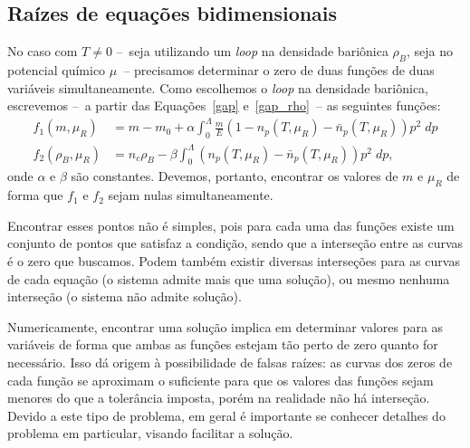 \subsection{Raízes de equações bidimensionais}

No caso com $T \neq 0$ --~seja utilizando um \emph{loop} na densidade bariônica $\rho_B$, seja no potencial químico $\mu$~-- precisamos determinar o zero de duas funções de duas variáveis simultaneamente. Como escolhemos o \emph{loop} na densidade bariônica, escrevemos --~a partir das Equações~\eqref{gap} e~\eqref{gap_rho}~-- as seguintes funções:
\begin{align}
	f_1(m, \mu_R) &= m - m_0 + \alpha\int_0^\Lambda \frac{m}{E} (1 - n_p(T, \mu_R) - \bar{n}_p(T, \mu_R)) p^2\;dp \\
	f_2(\rho_B, \mu_R) &= n_c\rho_B - \beta \int_0^\Lambda (n_p(T, \mu_R) - \bar{n}_p(T, \mu_R)) p^2\;dp,
\end{align}
%
onde $\alpha$ e $\beta$ são constantes. Devemos, portanto, encontrar os valores de $m$ e $\mu_R$ de forma que $f_1$ e $f_2$ sejam nulas simultaneamente.

Encontrar esses pontos não é simples, pois para cada uma das funções existe um conjunto de pontos que satisfaz a condição, sendo que a interseção entre as curvas é o zero que buscamos. Podem também existir diversas interseções para as curvas de cada equação (o sistema admite mais que uma solução), ou mesmo nenhuma interseção (o sistema não admite solução).

Numericamente, encontrar uma solução implica em determinar valores para as variáveis de forma que ambas as funções estejam tão perto de zero quanto for necessário. Isso dá origem à possibilidade de falsas raízes: as curvas dos zeros de cada função se aproximam o suficiente para que os valores das funções sejam menores do que a tolerância imposta, porém na realidade não há interseção. Devido a este tipo de problema, em geral é importante se conhecer detalhes do problema em particular, visando facilitar a solução.

